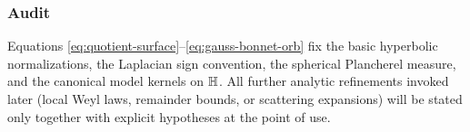 \subsubsection*{Audit}\label{rem:geometry-audit}

Equations \eqref{eq:quotient-surface}--\eqref{eq:gauss-bonnet-orb} fix the basic hyperbolic normalizations,
the Laplacian sign convention, the spherical Plancherel measure, and the canonical model kernels on $\mathbb{H}$.
All further analytic refinements invoked later (local Weyl laws, remainder bounds, or scattering expansions)
will be stated only together with explicit hypotheses at the point of use.


